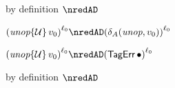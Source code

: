 {\begin{lamportproof*}
    \begin{pfproof}
        \begin{pfproof}
          \qedstep
            \begin{pfproof}
              by definition $\nredAD$
            \end{pfproof}
        \end{pfproof}
        \begin{pfproof}
          \qedstep
            \begin{pfproof}
              $\obars{\eunopt{\tdyn}{\svalue_0}}{\sowner_0} \nredAD \obars{\sdeltaA(\sunop, \svalue_0)}{\sowner_0}$
            \end{pfproof}
        \end{pfproof}
        \begin{pfproof}
          \qedstep
            \begin{pfproof}
              $\obars{\eunopt{\tdyn}{\svalue_0}}{\sowner_0} \nredAD
              \obars{\tagerrorD}{\sowner_0}$
            \end{pfproof}
        \end{pfproof}
    \end{pfproof}

    \begin{pfproof}
      \qedstep
        \begin{pfproof}
          by definition $\nredAD$
        \end{pfproof}
    \end{pfproof}

\end{lamportproof*}}

